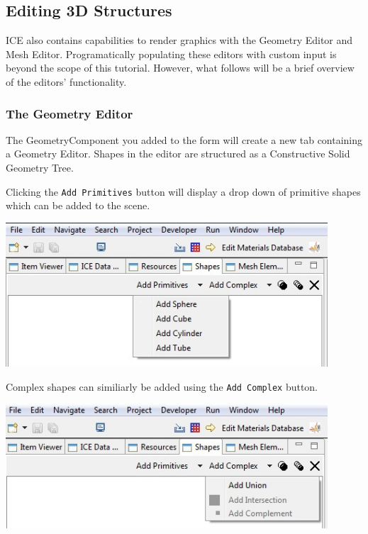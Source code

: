 \documentclass{article}
\begin{document}
\subsection{Editing 3D Structures}

ICE also contains capabilities to render graphics with the Geometry Editor and
Mesh Editor. Programatically populating these editors with custom input is
beyond the scope of this tutorial. However, what follows will be a brief
overview of the editors' functionality.

\subsubsection{The Geometry Editor}

The GeometryComponent you added to the form will create a new tab containing a
Geometry Editor. Shapes in the editor are structured as a Constructive Solid
Geometry Tree. 

Clicking the \texttt{Add Primitives} button will display a drop down of
primitive shapes which can be added to the scene.

\begin{center}
\includegraphics[width=12cm]{images/AddPrimitiveShape}
\end{center}

Complex shapes can similiarly be added using the \texttt{Add Complex} button.

\begin{center}
\includegraphics[width=12cm]{images/AddComplexShape}
\end{center}
\end{document}
